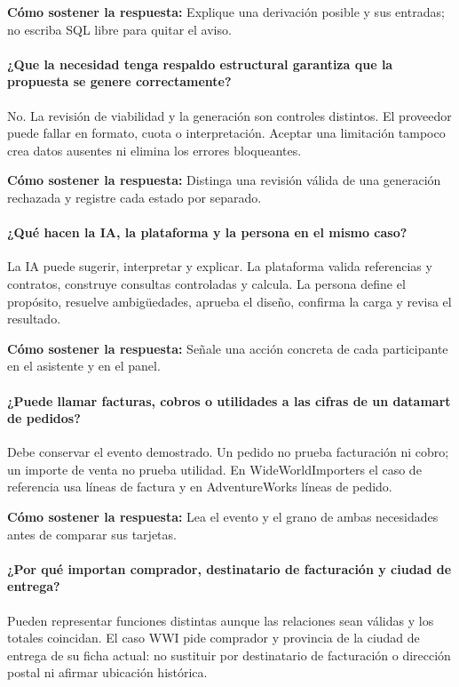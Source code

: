 \textbf{Cómo sostener la respuesta:} Explique una derivación posible y sus entradas; no escriba SQL libre para quitar el aviso.

\paragraph{¿Que la necesidad tenga respaldo estructural garantiza que la propuesta se genere correctamente?} No. La revisión de viabilidad y la generación son controles distintos. El proveedor puede fallar en formato, cuota o interpretación. Aceptar una limitación tampoco crea datos ausentes ni elimina los errores bloqueantes.

\textbf{Cómo sostener la respuesta:} Distinga una revisión válida de una generación rechazada y registre cada estado por separado.

\paragraph{¿Qué hacen la IA, la plataforma y la persona en el mismo caso?} La IA puede sugerir, interpretar y explicar. La plataforma valida referencias y contratos, construye consultas controladas y calcula. La persona define el propósito, resuelve ambigüedades, aprueba el diseño, confirma la carga y revisa el resultado.

\textbf{Cómo sostener la respuesta:} Señale una acción concreta de cada participante en el asistente y en el panel.

\paragraph{¿Puede llamar facturas, cobros o utilidades a las cifras de un datamart de pedidos?} Debe conservar el evento demostrado. Un pedido no prueba facturación ni cobro; un importe de venta no prueba utilidad. En WideWorldImporters el caso de referencia usa líneas de factura y en AdventureWorks líneas de pedido.

\textbf{Cómo sostener la respuesta:} Lea el evento y el grano de ambas necesidades antes de comparar sus tarjetas.

\paragraph{¿Por qué importan comprador, destinatario de facturación y ciudad de entrega?} Pueden representar funciones distintas aunque las relaciones sean válidas y los totales coincidan. El caso WWI pide comprador y provincia de la ciudad de entrega de su ficha actual: no sustituir por destinatario de facturación o dirección postal ni afirmar ubicación histórica.

